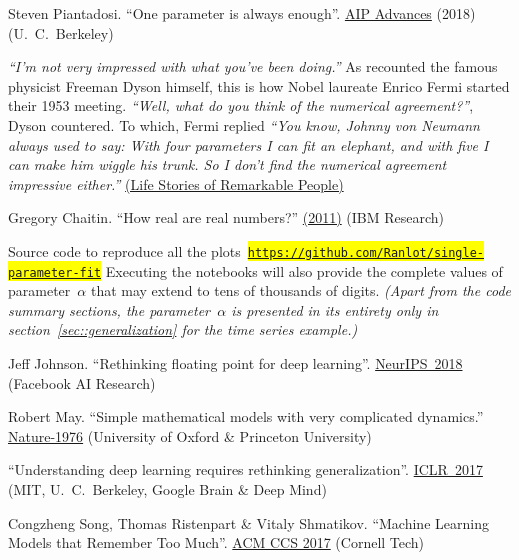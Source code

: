 \documentclass{article}
\begin{document}
\begin{thebibliography}{10}

 Steven Piantadosi. ``One parameter is always enough''. \href{https://aip.scitation.org/doi/10.1063/1.5031956}{AIP Advances} (2018) (U.~C.~Berkeley)

 {\it ``I'm not very impressed with what you've been doing.''}  As recounted the famous physicist Freeman Dyson himself, this is how Nobel laureate Enrico Fermi started their 1953 meeting. {\it ``Well, what do you think of the numerical agreement?''}, Dyson countered.  To which, Fermi replied {\it ``You know, Johnny von Neumann always used to say: With four parameters I can fit an elephant, and with five I can make him wiggle his trunk.  So I don't find the numerical agreement impressive either.''} \href{https://www.youtube.com/watch?v=hV41QEKiMlM}{(Life Stories of Remarkable People)}

 Gregory Chaitin. ``How real are real numbers?'' \href{http://dx.doi.org/10.1590/S0100-60452011000100006}{(2011)} (IBM Research)

 Source code to reproduce all the plots~\colorbox{yellow}{\href{https://github.com/Ranlot/single-parameter-fit}{\texttt{https://github.com/Ranlot/single-parameter-fit}}}  Executing the notebooks will also provide the complete values of parameter~$\alpha$ that may extend to tens of thousands of digits.  {\it (Apart from the code summary sections, the parameter~$\alpha$ is presented in its entirety only in section~\ref{sec::generalization} for the time series example.)}

 Jeff Johnson. ``Rethinking floating point for deep learning''. \href{https://arxiv.org/abs/1811.01721}{NeurIPS~2018} (Facebook AI Research)

 Robert May. ``Simple mathematical models with very complicated dynamics.'' \href{https://www.nature.com/articles/261459a0}{Nature-1976} (University of Oxford \& Princeton University)

 ``Understanding deep learning requires rethinking generalization''. \href{https://arxiv.org/abs/1611.03530}{ICLR~2017} (MIT, U.~C.~Berkeley, Google Brain \& Deep Mind)

 Congzheng Song, Thomas Ristenpart \& Vitaly Shmatikov. ``Machine Learning Models that Remember Too Much''. \href{http://www.cs.cornell.edu/~shmat/shmat_ccs17.pdf}{ACM CCS 2017} (Cornell Tech)

\end{thebibliography}
\end{document}
